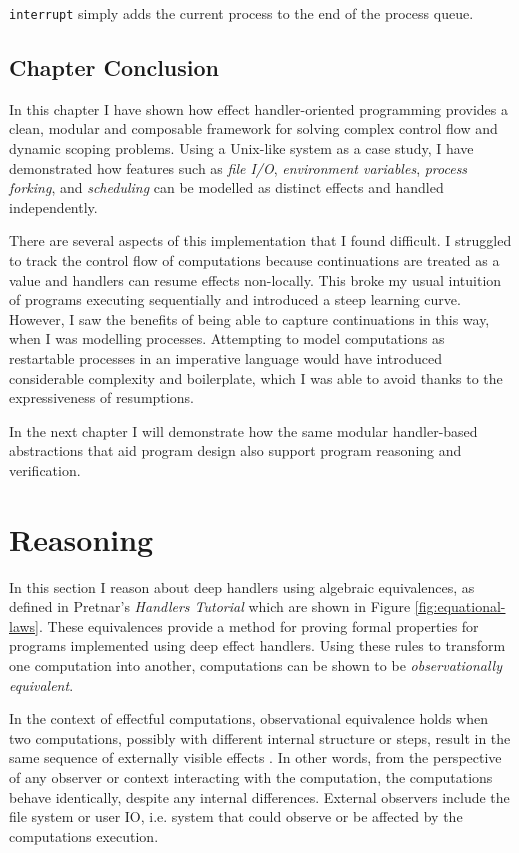 \documentclass[logo,bsc,singlespacing,parskip]{infthesis}
\begin{document}
\lstinline{interrupt} simply adds the current process to the end of the process queue.

\section{Chapter Conclusion}

In this chapter I have shown how effect handler-oriented programming provides a clean, modular and composable framework for solving complex control flow and dynamic scoping problems. Using a Unix-like system as a case study, I have demonstrated how features such as \textit{file I/O}, \textit{environment variables}, \textit{process forking}, and \textit{scheduling} can be modelled as distinct effects and handled independently. 

There are several aspects of this implementation that I found difficult. I struggled to track the control flow of computations because continuations are treated as a value and handlers can resume effects non-locally. This broke my usual intuition of programs executing sequentially and introduced a steep learning curve. However, I saw the benefits of being able to capture continuations in this way, when I was modelling processes. Attempting to model computations as restartable processes in an imperative language would have introduced considerable complexity and boilerplate, which I was able to avoid thanks to the expressiveness of resumptions.



In the next chapter I will demonstrate how the same modular handler-based abstractions that aid program design also support program reasoning and verification.




\chapter{Reasoning}

In this section I reason about deep handlers using algebraic equivalences, as defined in Pretnar's \textit{Handlers Tutorial} \cite{pretnar_introduction_2015} which are shown in Figure \ref{fig:equational-laws}.  These equivalences provide a method for proving formal properties for programs implemented using deep effect handlers. Using these rules to transform one computation into another, computations can be shown to be \textit{observationally equivalent}.

In the context of effectful computations, observational equivalence holds when two computations, possibly with different internal structure or steps, result in the same sequence of externally visible effects \cite{sannella1987observational}. In other words, from the perspective of any observer or context interacting with the computation, the computations behave identically, despite any internal differences. External observers include the file system or user IO, i.e. system that could observe or be affected by the computations execution.
\end{document}

